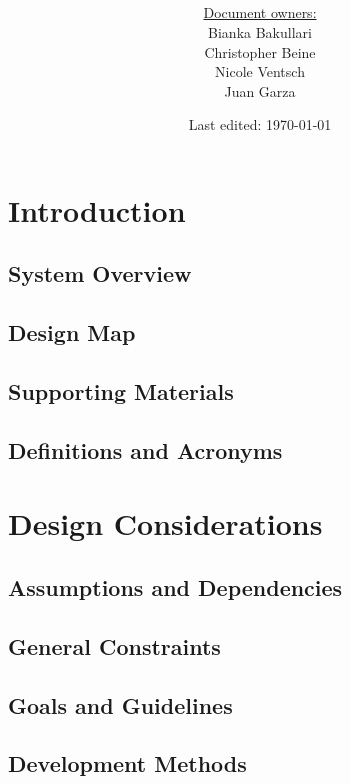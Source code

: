 \documentclass[notitlepage]{article}
\title{%
	\documentName\text{ } \\
  \large \projectName\text{ } \\
  }
\author{
	\large \underline{Document owners:}\\ 
	Bianka Bakullari\\
	\texttt{}
	Christopher Beine\\
	\texttt{}
	Nicole Ventsch\\
	\texttt{}
	Juan Garza\\
	\texttt{}
}
\date{\small{Last edited: \today}}
\begin{document}
\begin{titlepage}
\clearpage\maketitle			%
\thispagestyle{fancy}
\tableofcontents
\end{titlepage}

\rfoot{\thepage}				%


\begin{flushleft}				%


\section{Introduction}
\subsection{System Overview}
\subsection{Design Map}
\subsection{Supporting Materials}
\subsection{Definitions and Acronyms}

\section{Design Considerations}
\subsection{Assumptions and Dependencies}
\subsection{General Constraints}
\subsection{Goals and Guidelines}
\subsection{Development Methods}


\end{flushleft}
\end{document}
